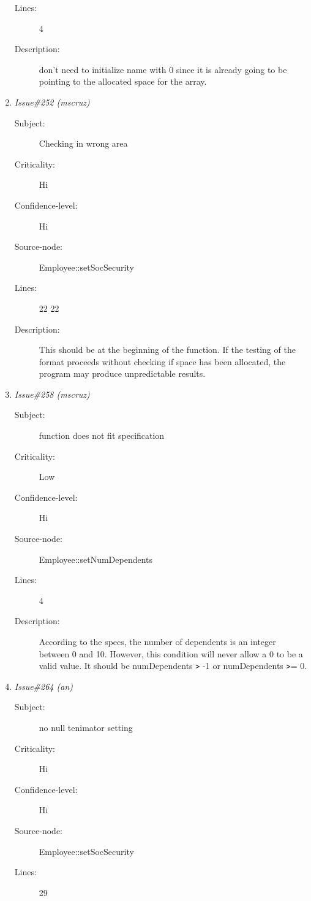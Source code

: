 \begin{enumerate}
\begin{description}
\item [Lines:] 4

\item [Description:] don't need to initialize name with 0 since it
is already going to be pointing to the allocated space for the array.
\end{description}
\item {\it Issue\#252 (mscruz)}
\begin{description}
\item [Subject:] Checking in wrong area
\item [Criticality:] Hi
\item [Confidence-level:] Hi
\item [Source-node:] Employee::setSocSecurity

\item [Lines:] 22 22

\item [Description:] This should be at the beginning of the
function.  If the testing of the format proceeds without checking if space
has been allocated, the program may produce unpredictable results.
\end{description}
\item {\it Issue\#258 (mscruz)}
\begin{description}
\item [Subject:] function does not fit specification
\item [Criticality:] Low
\item [Confidence-level:] Hi
\item [Source-node:] Employee::setNumDependents

\item [Lines:] 4

\item [Description:] According to the specs, the number of
dependents is an integer between 0 and 10.  However, this condition will
never allow a 0 to be a valid value.  It should be numDependents {\tt >} -1 or
numDependents {\tt >}= 0.
\end{description}
\item {\it Issue\#264 (an)}
\begin{description}
\item [Subject:] no null tenimator setting
\item [Criticality:] Hi
\item [Confidence-level:] Hi
\item [Source-node:] Employee::setSocSecurity

\item [Lines:] 29


\end{description}
\end{enumerate}
